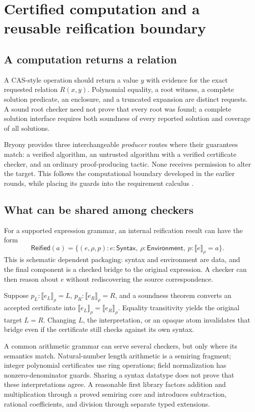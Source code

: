 \documentclass[11pt,a4paper]{article}
\newcommand{\interpret}[1]{\llbracket #1\rrbracket}
\theoremstyle{definition}\newtheorem{definition}[theorem]{Definition}
\theoremstyle{remark}\newtheorem{remark}[theorem]{Remark}
\begin{document}
\section{Certified computation and a reusable reification boundary}\label{sec:cas}

\subsection{A computation returns a relation}
A CAS-style operation should return a value $y$ with evidence for the exact requested relation $R(x,y)$. Polynomial equality, a root witness, a complete solution predicate, an enclosure, and a truncated expansion are distinct requests. A sound root checker need not prove that every root was found; a complete solution interface requires both soundness of every reported solution and coverage of all solutions.

Bryony provides three interchangeable \emph{producer} routes where their guarantees match: a verified algorithm, an untrusted algorithm with a verified certificate checker, and an ordinary proof-producing tactic. None receives permission to alter the target. This follows the computational boundary developed in the earlier rounds, while placing its guards into the requirement calculus \cite{synA,synB}.

\subsection{What can be shared among checkers}
For a supported expression grammar, an internal reification result can have the form
\[
 \mathsf{Reified}(a)=
 \{(e,\rho,p): e:\mathsf{Syntax},\ \rho:\mathsf{Environment},\
                    p:\interpret{e}_\rho=a\}.
\]
This is schematic dependent packaging: syntax and environment are data, and the final component is a checked bridge to the original expression. A checker can then reason about $e$ without rediscovering the source correspondence.

Suppose $p_L:\interpret{e_L}_\rho=L$, $p_R:\interpret{e_R}_\rho=R$, and a soundness theorem converts an accepted certificate into
$\interpret{e_L}_\rho=\interpret{e_R}_\rho$. Equality transitivity yields the original target $L=R$. Changing $L$, the interpretation, or an opaque atom invalidates that bridge even if the certificate still checks against its own syntax.

A common arithmetic grammar can serve several checkers, but only where its semantics match. Natural-number length arithmetic is a semiring fragment; integer polynomial certificates use ring operations; field normalization has nonzero-denominator guards. Sharing a syntax datatype does not prove that these interpretations agree. A reasonable first library factors addition and multiplication through a proved semiring core and introduces subtraction, rational coefficients, and division through separate typed extensions.
\end{document}
